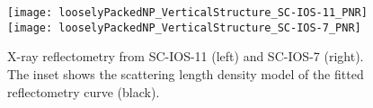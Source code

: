 \documentclass[\main/dresen_thesis.tex]{subfiles}
\begin{document}
  \label{sec:looselyPackedNS:layers:pnr}
  \begin{figure}[tb]
    \centering
    \texttt{[image: looselyPackedNP\_VerticalStructure\_SC-IOS-11\_PNR]}
    \texttt{[image: looselyPackedNP\_VerticalStructure\_SC-IOS-7\_PNR]}
    \caption{\label{fig:looselyPackedNP:layer:xrr}X-ray reflectometry from SC-IOS-11 (left) and SC-IOS-7 (right). The inset shows the scattering length density model of the fitted reflectometry curve (black).}
  \end{figure}


\end{document}
